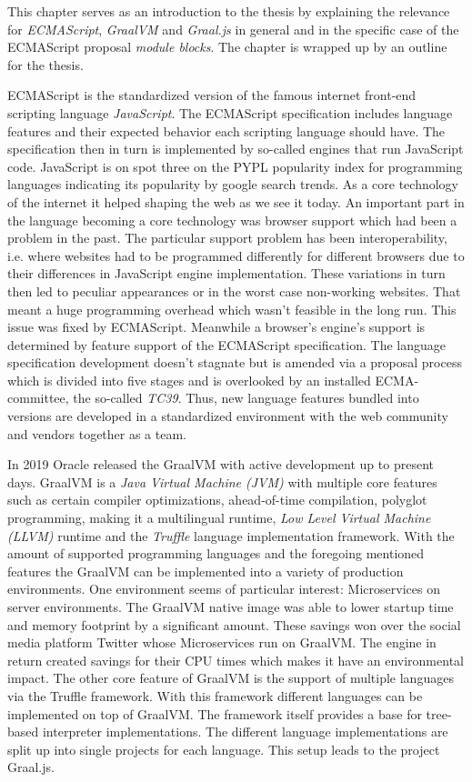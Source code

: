 This chapter serves as an introduction to the thesis by explaining the relevance for \emph{ECMAScript}, \emph{GraalVM} and \emph{Graal.js} in general and in the specific case of the ECMAScript proposal \emph{module blocks}. The chapter is wrapped up by an outline for the thesis.

ECMAScript \cite{ecma} is the standardized version of the famous internet front-end scripting language \emph{JavaScript}. The ECMAScript specification includes language features and their expected behavior each scripting language should have. The specification then in turn is implemented by so-called engines that run JavaScript code. JavaScript is on spot three on the PYPL popularity index for programming languages indicating its popularity by google search trends. \cite{pypl} As a core technology of the internet it helped shaping the web as we see it today. An important part in the language becoming a core technology was browser support which had been a problem in the past. The particular support problem has been interoperability, i.e. where websites had to be programmed differently for different browsers due to their differences in JavaScript engine implementation. \cite{10.1145/3386327} These variations in turn then led to peculiar appearances or in the worst case non-working websites. That meant a huge programming overhead which wasn't feasible in the long run. This issue was fixed by ECMAScript. Meanwhile a browser's engine's support is determined by feature support of the ECMAScript specification. The language specification development doesn't stagnate but is amended via a proposal process which is divided into five stages and is overlooked by an installed ECMA-committee, the so-called \emph{TC39}. Thus, new language features bundled into versions are developed in a standardized environment with the web community and vendors together as a team. 

In 2019 Oracle released the GraalVM with active development up to present days. GraalVM \cite{graalVMStart} is a \emph{Java Virtual Machine (JVM)} with multiple core features such as certain compiler optimizations, ahead-of-time compilation, polyglot programming, making it a multilingual runtime, \emph{Low Level Virtual Machine (LLVM)} runtime and the \emph{Truffle} language implementation framework. With the amount of supported programming languages and the foregoing mentioned features the GraalVM can be implemented into a variety of production environments. One environment seems of particular interest: Microservices on server environments. The GraalVM native image was able to lower startup time and memory footprint by a significant amount. \cite{graalVMNative} These savings won over the social media platform Twitter whose Microservices run on GraalVM. \cite{graalTwitter} The engine in return created savings for their CPU times which makes it have an environmental impact. The other core feature of GraalVM is the support of multiple languages via the Truffle framework. With this framework different languages can be implemented on top of GraalVM. \cite{graalVMIntro} The framework itself provides a base for tree-based interpreter implementations. The different language implementations are split up into single projects for each language. This setup leads to the project Graal.js.

